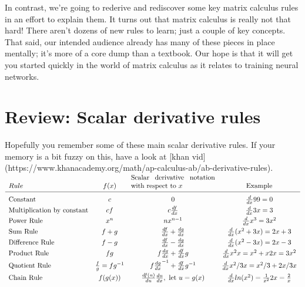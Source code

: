 \documentclass[11pt]{article}
\begin{document}
In contrast, we're going to rederive and rediscover some key matrix calculus rules in an effort to explain them. It turns out that matrix calculus is really not that hard! There aren't dozens of new rules to learn; just a couple of key concepts.  That said, our intended audience already has many of these pieces in place mentally; it's more of a core dump than a textbook. Our hope is that it will get you started quickly in the world of matrix calculus as it relates to training neural networks.

\section{Review: Scalar derivative rules}

Hopefully you remember some of these main scalar derivative rules. If your memory is a bit fuzzy on this, have a look at [khan vid](https://www.khanacademy.org/math/ap-calculus-ab/ab-derivative-rules).

\[
\begin{array}{lccc}
Rule & f(x) & \text{\parbox[t][0mm][b]{43mm}{Scalar derivative notation with respect to $x$}} & \text{Example}\\
\\[\dimexpr-\normalbaselineskip+2pt]
\hline
\\[\dimexpr-\normalbaselineskip+5pt]
\vspace{1mm}
\text{Constant} & c & 0 &  \frac{d}{dx}99 = 0\\
\vspace{1mm}
\text{Multiplication by constant} &	cf	&c \frac{df}{dx} & \frac{d}{dx}3x = 3\\
\vspace{1mm}
\text{Power Rule}	& x^n	& nx^{n-1} & \frac{d}{dx}x^3 = 3x^2\\
\vspace{1mm}
\text{Sum Rule}	& f + g	& \frac{df}{dx} + \frac{dg}{dx} & \frac{d}{dx} (x^2 + 3x) = 2x + 3\\
\vspace{1mm}
\text{Difference Rule}	& f - g	& \frac{df}{dx} - \frac{dg}{dx} & \frac{d}{dx}(x^2 - 3x) = 2x - 3\\
\vspace{1mm}
\text{Product Rule}	& fg & f \frac{dg}{dx} + \frac{df}{dx} g & \frac{d}{dx}x^2x = x^2 + x2x = 3x^2\\
\vspace{1mm}
\text{Quotient Rule}	& \frac{f}{g} = fg^{-1} & f \frac{dg}{dx}^{-1} + \frac{df}{dx} g^{-1} & \frac{d}{dx}x^2 / 3x = x^2/3 + 2x / 3x\\
\text{Chain Rule}	 & f(g(x)) &   \frac{df(u)}{du}\frac{du}{dx}, \text{ let } u=g(x) & \frac{d}{dx} ln(x^2) = \frac{1}{x^2}2x = \frac{2}{x}\\
\end{array}
\]
\end{document}
